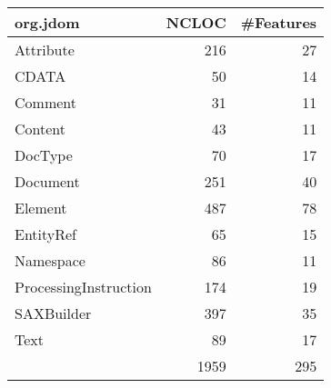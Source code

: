 \begin{tabular}{|l|r|r|}\hline
org.jdom & NCLOC & \#Features\\\hline\hline
Attribute & 216 & 27\\\hline
CDATA & 50 & 14\\\hline
Comment & 31 & 11\\\hline
Content & 43 & 11\\\hline
DocType & 70 & 17\\\hline
Document & 251 & 40\\\hline
Element & 487 & 78\\\hline
EntityRef & 65 & 15\\\hline
Namespace & 86 & 11\\\hline
ProcessingInstruction & 174 & 19\\\hline
SAXBuilder & 397 & 35\\\hline
Text & 89 & 17\\\hline
\hline
 & 1959 & 295\\\hline
\end{tabular}
